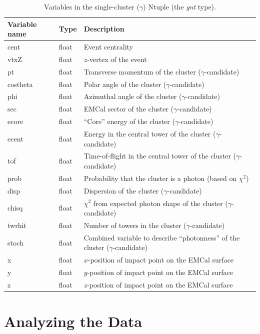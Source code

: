 \documentclass[pdftex,12pt,letter]{article}
\begin{document}
\begin{table}[h]
  \begin{tabular}{|l|l|l|} \hline
    Variable name & Type & Description \\ \hline
    cent & float & Event centrality \\
    vtxZ & float & $z$-vertex of the event \\
    pt   & float & Transverse momentum of the cluster ($\gamma$-candidate) \\
    costheta & float & Polar angle of the cluster ($\gamma$-candidate) \\    
    phi & float & Azimuthal angle of the cluster ($\gamma$-candidate) \\
    sec & float & EMCal sector of the cluster ($\gamma$-candidate) \\
    ecore & float & ``Core'' energy of the cluster ($\gamma$-candidate) \\
    ecent & float & Energy in the central tower of the cluster ($\gamma$-candidate) \\
    tof   & float & Time-of-flight in the central tower of the cluster ($\gamma$-candidate) \\
    prob & float & Probability that the cluster is a photon (based on $\chi^2$) \\
    disp & float & Dispersion of the cluster ($\gamma$-candidate) \\
    chisq & float & $\chi^2$ from expected photon shape of the cluster ($\gamma$-candidate) \\
    twrhit & float & Number of towers in the cluster ($\gamma$-candidate) \\
    stoch & float & Combined variable to describe ``photonness'' of the cluster ($\gamma$-candidate) \\
    x & float & $x$-position of impact point on the EMCal surface \\
    y & float & $y$-position of impact point on the EMCal surface \\
    z & float & $z$-position of impact point on the EMCal surface \\ \hline
  \end{tabular}
  \vspace{0.3cm}
  \caption{Variables in the single-cluster ($\gamma$) Ntuple (the {\it gnt} type).
}
  \label{tab:gnt}
 \end{table}

\section{Analyzing the Data}
\label{code}
\end{document}
